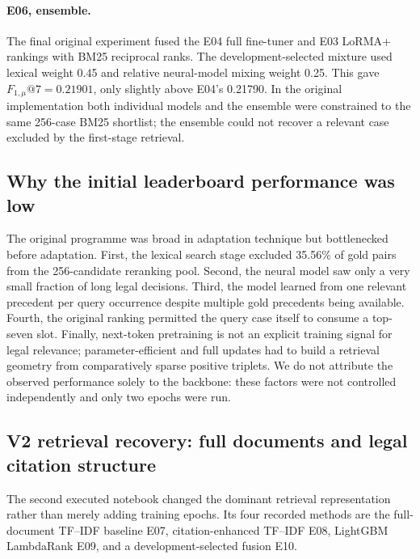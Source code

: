 \paragraph{E06, ensemble.}
The final original experiment fused the E04 full fine-tuner and E03 LoRMA+
rankings with BM25 reciprocal ranks. The development-selected mixture used
lexical weight 0.45 and relative neural-model mixing weight 0.25. This gave
$F_{1,\mu}@7=0.21901$, only slightly above E04's 0.21790. In the original
implementation both individual models and the ensemble were constrained to
the same 256-case BM25 shortlist; the ensemble could not recover a relevant
case excluded by the first-stage retrieval.

\subsection{Why the initial leaderboard performance was low}
\label{subsec:p7-failures}
The original programme was broad in adaptation technique but bottlenecked
before adaptation. First, the lexical search stage excluded 35.56\% of gold
pairs from the 256-candidate reranking pool. Second, the neural model saw only
a very small fraction of long legal decisions. Third, the model learned from
one relevant precedent per query occurrence despite multiple gold precedents
being available. Fourth, the original ranking permitted the query case itself
to consume a top-seven slot. Finally, next-token pretraining is not an
explicit training signal for legal relevance; parameter-efficient and full
updates had to build a retrieval geometry from comparatively sparse positive
triplets. We do not attribute the observed performance solely to the backbone:
these factors were not controlled independently and only two epochs were run.

\subsection{V2 retrieval recovery: full documents and legal citation structure}
\label{subsec:p7-v2}
The second executed notebook changed the dominant retrieval representation
rather than merely adding training epochs. Its four recorded methods are the
full-document TF--IDF baseline E07, citation-enhanced TF--IDF E08,
LightGBM LambdaRank E09, and a development-selected fusion E10.

